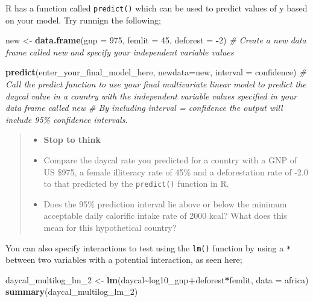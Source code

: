 \documentclass[
]{book}
\newenvironment{Shaded}{\begin{snugshade}}{\end{snugshade}}
\newcommand{\AttributeTok}[1]{\textcolor[rgb]{0.13,0.29,0.53}{#1}}
\newcommand{\CommentTok}[1]{\textcolor[rgb]{0.56,0.35,0.01}{\textit{#1}}}
\newcommand{\DecValTok}[1]{\textcolor[rgb]{0.00,0.00,0.81}{#1}}
\newcommand{\FunctionTok}[1]{\textcolor[rgb]{0.13,0.29,0.53}{\textbf{#1}}}
\newcommand{\NormalTok}[1]{#1}
\newcommand{\OtherTok}[1]{\textcolor[rgb]{0.56,0.35,0.01}{#1}}
\newcommand{\SpecialCharTok}[1]{\textcolor[rgb]{0.81,0.36,0.00}{\textbf{#1}}}
\newcommand{\StringTok}[1]{\textcolor[rgb]{0.31,0.60,0.02}{#1}}
\providecommand{\tightlist}{%
  \setlength{\itemsep}{0pt}\setlength{\parskip}{0pt}}
\begin{document}
R has a function called \texttt{predict()} which can be used to predict values of y based on your model. Try runnign the following;

\begin{Shaded}
\begin{Highlighting}[]
\NormalTok{new }\OtherTok{\textless{}{-}} \FunctionTok{data.frame}\NormalTok{(}\AttributeTok{gnp =} \DecValTok{975}\NormalTok{, }\AttributeTok{femlit =} \DecValTok{45}\NormalTok{, }\AttributeTok{deforest =} \SpecialCharTok{{-}}\DecValTok{2}\NormalTok{)}
\CommentTok{\# Create a new data frame called \textasciigrave{}new\textasciigrave{} and specify your independent variable values}

\FunctionTok{predict}\NormalTok{(enter\_your\_final\_model\_here, }\AttributeTok{newdata=}\NormalTok{new, }\AttributeTok{interval =} \StringTok{\textquotesingle{}confidence\textquotesingle{}}\NormalTok{)}
\CommentTok{\# Call the predict function to use your final multivariate linear model to predict the daycal value in a country with the independent variable values specified in your data frame called \textasciigrave{}new\textasciigrave{}}
\CommentTok{\# By including interval = \textquotesingle{}confidence\textquotesingle{} the output will include 95\% confidence intervals.}
\end{Highlighting}
\end{Shaded}

\begin{quote}
\begin{itemize}
\tightlist
\item
  \textbf{Stop to think}
\item
  Compare the daycal rate you predicted for a country with a GNP of US \$975, a female illiteracy rate of 45\% and a deforestation rate of -2.0 to that predicted by the \texttt{predict()} function in R.
\item
  Does the 95\% prediction interval lie above or below the minimum acceptable daily calorific intake rate of 2000 kcal? What does this mean for this hypothetical country?
\end{itemize}
\end{quote}

You can also specify interactions to test using the \texttt{lm()} function by using a \texttt{*} between two variables with a potential interaction, as seen here;

\begin{Shaded}
\begin{Highlighting}[]
\NormalTok{daycal\_multilog\_lm\_2 }\OtherTok{\textless{}{-}} \FunctionTok{lm}\NormalTok{(daycal}\SpecialCharTok{\textasciitilde{}}\NormalTok{log10\_gnp}\SpecialCharTok{+}\NormalTok{deforest}\SpecialCharTok{*}\NormalTok{femlit, }\AttributeTok{data =}\NormalTok{ africa)}
\FunctionTok{summary}\NormalTok{(daycal\_multilog\_lm\_2)}
\end{Highlighting}
\end{Shaded}
\end{document}
